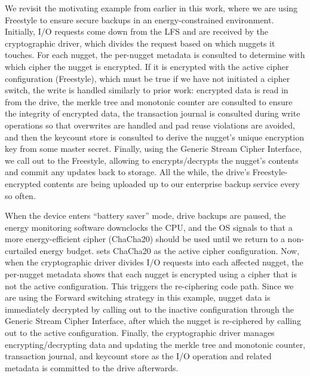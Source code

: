 We revisit the motivating example from earlier in this work, where we
are using Freestyle to ensure secure backups in an energy-constrained
environment.  Initially, I/O requests come down from the LFS and are
received by the cryptographic driver, which divides the request based
on which nuggets it touches. For each nugget, the per-nugget metadata
is consulted to determine with which cipher the nugget is encrypted.
If it is encrypted with the active cipher configuration (Freestyle),
which must be true if we have not initiated a cipher switch, the write
is handled similarly to prior work: encrypted data is read in from the
drive, the merkle tree and monotonic counter are consulted to ensure
the integrity of encrypted data, the transaction journal is consulted
during write operations so that overwrites are handled and pad reuse
violations are avoided, and then the keycount store is consulted to
derive the nugget's unique encryption key from some master secret.
Finally, using the Generic Stream Cipher Interface, we call out to the
Freestyle, allowing \sys to encrypts/decrypts the nugget's
contents and commit any updates back to storage.  All the while, the
drive's Freestyle-encrypted contents are being uploaded up to our
enterprise backup service every so often. 

When the device enters ``battery saver'' mode, drive backups are paused, the
energy monitoring software downclocks the CPU, and the OS signals to \sys
that a more energy-efficient cipher (ChaCha20) should be used until we return to
a non-curtailed energy budget. \sys sets ChaCha20 as the active cipher
configuration. Now, when the cryptographic driver divides I/O requests into each
affected nugget, the per-nugget metadata shows \sys that each nugget is
encrypted using a cipher that is not the active configuration. This triggers the
re-ciphering code path. Since we are using the Forward switching strategy in
this example, nugget data is immediately decrypted by calling out to the
inactive configuration through the Generic Stream Cipher Interface, after which
the nugget is re-ciphered by calling out to the active configuration. Finally,
the cryptographic driver manages encrypting/decrypting data and updating the
merkle tree and monotonic counter, transaction journal, and keycount store as
the I/O operation and related metadata is committed to the drive afterwards.

